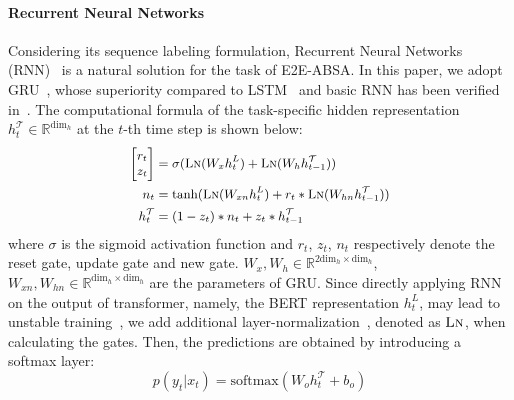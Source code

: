 \documentclass[11pt,a4paper]{article}
\begin{document}
\paragraph{Recurrent Neural Networks} Considering its sequence labeling formulation, Recurrent Neural Networks (RNN)~\cite{elman1990finding} is a natural solution for the task of E2E-ABSA. In this paper, we adopt GRU~\cite{cho-etal-2014-learning}, whose superiority compared to LSTM~\cite{hochreiter1997long} and basic RNN has been verified in~\citet{jozefowicz2015empirical}. The computational formula of the task-specific hidden representation $h^{\mathcal{T}}_t \in \mathbb{R}^{\mathrm{dim}_h}$ at the $t$-th time step is shown below:
\begin{equation}
\small
    \begin{split}
        \begin{bmatrix}
        r_t \\
        z_t
     \end{bmatrix}
     &= \sigma(\textsc{Ln}(W_x h^L_t)+\textsc{Ln}(W_h h^{\mathcal{T}}_{t-1})) \\
     n_t &= \text{tanh}(\textsc{Ln}(W_{xn} h^L_t)+r_t * \textsc{Ln}(W_{hn} h^{\mathcal{T}}_{t-1})) \\
     h^{\mathcal{T}}_{t} &= (1-z_t) * n_t + z_t * h^{\mathcal{T}}_{t-1}
    \end{split}
\end{equation}
where $\sigma$ is the sigmoid activation function and $r_t$, $z_t$, $n_t$ respectively denote the reset gate, update gate and new gate. $W_x,W_h \in \mathbb{R}^{2\mathrm{dim}_h \times \mathrm{dim}_h}$, $W_{xn}, W_{hn} \in \mathbb{R}^{\mathrm{dim}_h \times \mathrm{dim}_h}$ are the parameters of GRU. Since directly applying RNN on the output of transformer, namely, the BERT representation $h^L_t$, may lead to unstable training~\cite{chen-etal-2018-best,liu2019fine}, we add additional layer-normalization~\cite{ba2016layer}, denoted as $\textsc{Ln}$, when calculating the gates. Then, the predictions are obtained by introducing a softmax layer:
\begin{equation}
\label{output}
    p(y_t|x_t) = \text{softmax}(W_o h^{\mathcal{T}}_t + b_o) 
\end{equation}
\end{document}
